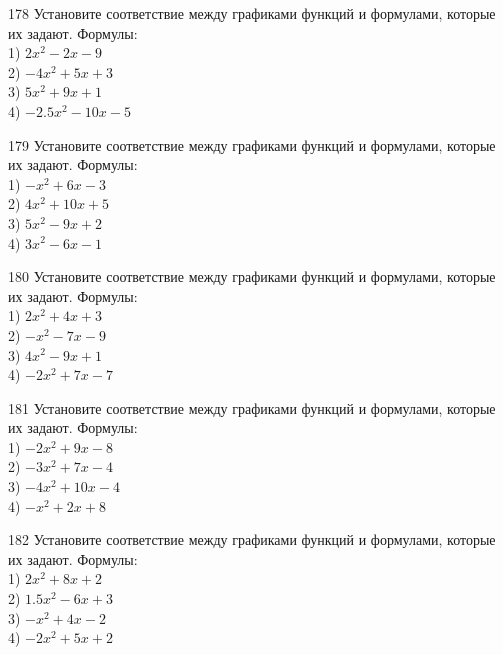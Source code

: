 \documentclass[4apaper]{article}
\begin{document}
\begin{taskBN}{178}
Установите соответствие между графиками функций и формулами, которые их задают. Формулы: \\1) $2x^2-2x-9$\\2) $-4x^2+5x+3$\\3) $5x^2+9x+1$\\4) $-2.5x^2-10x-5$
\end{taskBN}

\begin{taskBN}{179}
Установите соответствие между графиками функций и формулами, которые их задают. Формулы: \\1) $-x^2+6x-3$\\2) $4x^2+10x+5$\\3) $5x^2-9x+2$\\4) $3x^2-6x-1$
\end{taskBN}

\begin{taskBN}{180}
Установите соответствие между графиками функций и формулами, которые их задают. Формулы: \\1) $2x^2+4x+3$\\2) $-x^2-7x-9$\\3) $4x^2-9x+1$\\4) $-2x^2+7x-7$
\end{taskBN}

\begin{taskBN}{181}
Установите соответствие между графиками функций и формулами, которые их задают. Формулы: \\1) $-2x^2+9x-8$\\2) $-3x^2+7x-4$\\3) $-4x^2+10x-4$\\4) $-x^2+2x+8$
\end{taskBN}

\begin{taskBN}{182}
Установите соответствие между графиками функций и формулами, которые их задают. Формулы: \\1) $2x^2+8x+2$\\2) $1.5x^2-6x+3$\\3) $-x^2+4x-2$\\4) $-2x^2+5x+2$
\end{taskBN}
\end{document}
